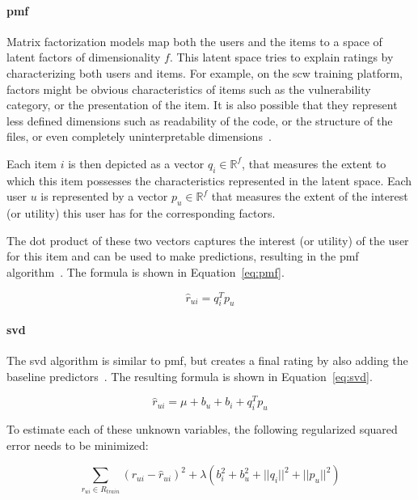 \paragraph{\gls{pmf}}
Matrix factorization models map both the users and the items to a space of latent factors of dimensionality $f$.
This latent space tries to explain ratings by characterizing both users and items.
For example, on the \gls{scw} training platform, factors might be obvious characteristics of items such as the vulnerability category, or the presentation of the item.
It is also possible that they represent less defined dimensions such as readability of the code, or the structure of the files, or even completely uninterpretable dimensions~\cite{Ricci2010}.

Each item $i$ is then depicted as a vector $q_i \in \mathbb{R}^f$, that measures the extent to which this item possesses the characteristics represented in the latent space.
Each user $u$ is represented by a vector $p_u \in \mathbb{R}^f$ that measures the extent of the interest (or utility) this user has for the corresponding factors.

The dot product of these two vectors captures the interest (or utility) of the user for this item and can be used to make predictions, resulting in the \gls{pmf} algorithm~\cite{mnih2008probabilistic,Hug2020}.
The formula is shown in Equation~\ref{eq:pmf}.

\begin{equation}
  \label{eq:pmf}
  \hat{r}_{ui} = q_i^T p_u 
\end{equation}

\paragraph{\gls{svd}}
The \gls{svd} algorithm is similar to \gls{pmf}, but creates a final rating by also adding the baseline predictors~\cite{koren2009matrix, Ricci2010, Hug2020}. 
The resulting formula is shown in Equation~\ref{eq:svd}.

\begin{equation}
  \label{eq:svd}
  \hat{r}_{ui} = \mu + b_u + b_i + q_i^T p_u 
\end{equation}

To estimate each of these unknown variables, the following regularized squared error needs to be minimized:

\begin{equation}
     \sum_{r_{ui} \in R_{train}} \left(r_{ui} - \hat{r}_{ui} \right)^2 +
        \lambda\left(b_i^2 + b_u^2 + ||q_i||^2 + ||p_u||^2\right)
\end{equation}

